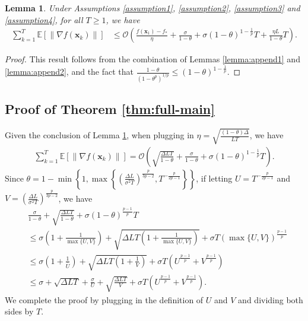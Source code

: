 \documentclass{article}
\newcommand{\bx}{\boldsymbol{x}}
\theoremstyle{plain}
\newtheorem{lemma}[theorem]{Lemma}
\theoremstyle{definition}
\theoremstyle{remark}
\begin{document}
\begin{lemma}\label{lemma:append3}
Under Assumptions \ref{assumption1}, \ref{assumption2}, \ref{assumption3} and \ref{assumption4}, for all $T\geq 1$, we have
    \begin{align*}
\sum_{k=1}^T \mathbb{E}[ \|\nabla f(\bx_k)\|] & \leq \mathcal{O}\left(\frac{f(\bx_1) - f_{*}}{\eta}   + \frac{ \sigma}{1-\theta} + \sigma(1-\theta)^{1-\frac{1}{p}}T + \frac{\eta L}{1-\theta} T \right).
\end{align*}
\end{lemma}

\begin{proof}
    This result follows from the combination of Lemmas \ref{lemma:append1} and \ref{lemma:append2}, and the fact that $\frac{1-\theta}{(1-\theta^p)^{1/p}}\leq (1-\theta)^{1-\frac{1}{p}}$.
\end{proof}


\subsection{Proof of Theorem \ref{thm:full-main}}
Given the conclusion of Lemma \ref{lemma:append3}, when plugging in $\eta=\sqrt{\frac{(1-\theta)\Delta}{LT}}$, we have
\begin{align*}
\sum_{k=1}^T \mathbb{E}[ \|\nabla f(\bx_k)\|] = \mathcal{O}\left(\sqrt{\frac{\Delta LT }{1-\theta}}   + \frac{ \sigma}{1-\theta} + \sigma(1-\theta)^{1-\frac{1}{p}}T \right).
\end{align*}
Since $\theta = 1 - \min \left\{ 1, \max \left\{\left( \frac{\Delta L }{\sigma^2 T}\right)^{\frac{p}{3p-2}},T^{-\frac{p}{2p-1}}\right\} \right\}$, if letting $U=T^{-\frac{p}{2p-1}}$ and $V=\left( \frac{\Delta L }{\sigma^2 T}\right)^{\frac{p}{3p-2}}$, we have
\begin{align*}
& \frac{\sigma}{1-\theta} + \sqrt{\frac{\Delta LT}{1-\theta}} + \sigma(1-\theta)^{\frac{p-1}{p}} T 
\\
& \leq \sigma \left(1 + \frac{1}{\max\{U, V\}}\right) + \sqrt{\Delta LT\left(1 + \frac{1}{\max\{U, V\}}\right)} + \sigma T(\max\{U, V\})^{\frac{p-1}{p}}\\
& \leq \sigma\left(1 + \frac{1}{\overline{U}}\right) + \sqrt{\Delta LT\left(1 + \frac{1}{{V}}\right)} + \sigma T\left(U^{\frac{p-1}{p}} + V^{\frac{p-1}{p}}\right)
\\
& \leq \sigma + \sqrt{\Delta LT} + \frac{\sigma}{{U}} + \sqrt{\frac{\Delta LT}{{V}}} + \sigma T\left(U^{\frac{p-1}{p}} + V^{\frac{p-1}{p}}\right).
\end{align*}
We complete the proof by plugging in the definition of $U$ and $V$ and dividing both sides by $T$.
\end{document}
